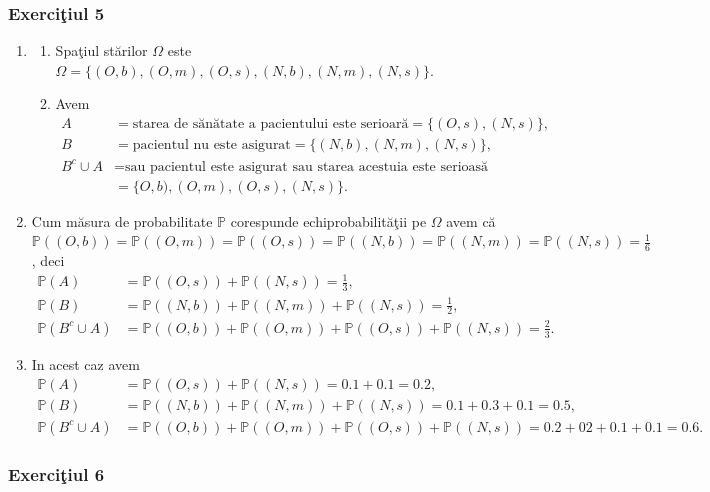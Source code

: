 \documentclass[]{article}
\def\Om{\Omega}
\def\PP{{\mathbb P}}
\begin{document}
\subsubsection{\texorpdfstring{Exerci\c tiul
5}{Exerciiul 5}}\label{exerciiul-5}

\begin{enumerate}
\item
    \begin{enumerate}
        \item Spa\c tiul st\u arilor $\Om$ este $\Om=\{(O,b),(O,m),(O,s),(N,b),(N,m),(N,s)\}$.
        \item Avem
        \begin{align*}
            A &= \mbox{starea de s\u an\u atate a pacientului este serioar\u a} = \{(O,s),(N,s)\},\\
            B &= \mbox{pacientul nu este asigurat} = \{(N,b),(N,m),(N,s)\},\\
            B^{c}\cup A &= \mbox{sau pacientul este asigurat sau starea acestuia este serioas\u a}\\
                &= \{O,b),(O,m),(O,s),(N,s)\}.
        \end{align*}
    \end{enumerate}
\item Cum m\u asura de probabilitate $\PP$ corespunde echiprobabilit\u a\c tii pe $\Om$ avem c\u a $\PP((O,b))=\PP((O,m))=\PP((O,s))=\PP((N,b))=\PP((N,m))=\PP((N,s))=\frac{1}{6}$, deci
    \begin{align*}
            \PP(A) &= \PP((O,s))+\PP((N,s)) = \frac{1}{3},\\
            \PP(B) &= \PP((N,b))+\PP((N,m))+\PP((N,s)) = \frac{1}{2},\\
            \PP(B^c\cup A) &= \PP((O,b))+\PP((O,m))+\PP((O,s))+\PP((N,s)) = \frac{2}{3}.
    \end{align*}
\item In acest caz avem
    \begin{align*}
            \PP(A) &= \PP((O,s))+\PP((N,s)) = 0.1+0.1 = 0.2,\\
            \PP(B) &= \PP((N,b))+\PP((N,m))+\PP((N,s)) = 0.1+0.3+0.1 = 0.5,\\
            \PP(B^c\cup A) &= \PP((O,b))+\PP((O,m))+\PP((O,s))+\PP((N,s)) = 0.2+02+0.1+0.1 = 0.6.
    \end{align*}

\end{enumerate}

\subsubsection{\texorpdfstring{Exerci\c tiul
6}{Exerciiul 6}}\label{exerciiul-6}
\end{document}
